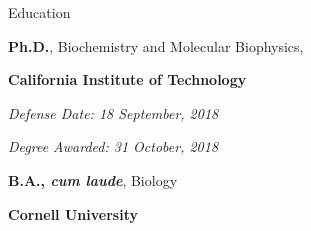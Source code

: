 \begin{rubric}{Education}

\entry*[2013--2018]
	\textbf{Ph.D.}, Biochemistry and Molecular Biophysics,
	\par \textbf{California Institute of Technology}
	\par \emph{Defense Date: 18 September, 2018}
	\par \emph{Degree Awarded: 31 October, 2018}


\entry*[2009--2013]%
	\textbf{B.A., \emph{cum laude}}, Biology
	\par \textbf{Cornell University}

\end{rubric}
